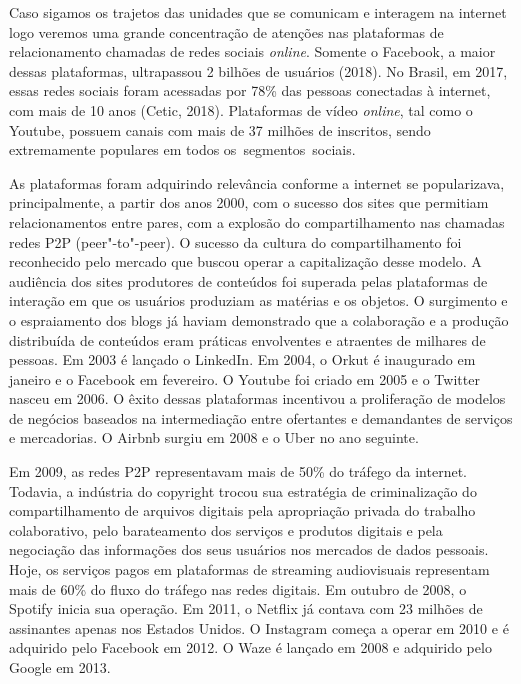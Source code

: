 Caso sigamos os trajetos das unidades que se comunicam e interagem na
internet logo veremos uma grande concentração de atenções nas
plataformas de relacionamento chamadas de redes sociais \emph{online}. Somente
o Facebook, a maior dessas plataformas, ultrapassou 2 bilhões de
usuários (2018). No Brasil, em 2017, essas redes sociais foram acessadas
por 78\% das pessoas conectadas à internet, com mais de 10 anos (Cetic,
2018). Plataformas de vídeo \emph{online}, tal como o Youtube, possuem canais
com mais de 37 milhões de inscritos, sendo extremamente populares em
todos os~segmentos~sociais.

As plataformas foram adquirindo relevância conforme a internet se
popularizava, principalmente, a partir dos anos 2000, com o sucesso dos
sites que permitiam relacionamentos entre pares, com a explosão do
compartilhamento nas chamadas redes P2P (peer"-to"-peer). O sucesso da
cultura do compartilhamento foi reconhecido pelo mercado que buscou
operar a capitalização desse modelo. A audiência dos sites produtores de
conteúdos foi superada pelas plataformas de interação em que os usuários
produziam as matérias e os objetos. O surgimento e o espraiamento dos
blogs já haviam demonstrado que a colaboração e a produção distribuída
de conteúdos eram práticas envolventes e atraentes de milhares de
pessoas. Em 2003 é lançado o LinkedIn. Em 2004, o Orkut é inaugurado em
janeiro e o Facebook em fevereiro. O Youtube foi criado em 2005 e o
Twitter nasceu em 2006. O êxito dessas plataformas incentivou a
proliferação de modelos de negócios baseados na intermediação entre
ofertantes e demandantes de serviços e mercadorias. O Airbnb surgiu em
2008 e o Uber no ano seguinte.

Em 2009, as redes P2P representavam mais de 50\% do tráfego da internet.
Todavia, a indústria do copyright trocou sua estratégia de
criminalização do compartilhamento de arquivos digitais pela apropriação
privada do trabalho colaborativo, pelo barateamento dos serviços e
produtos digitais e pela negociação das informações dos seus usuários
nos mercados de dados pessoais. Hoje, os serviços pagos em plataformas
de streaming audiovisuais representam mais de 60\% do fluxo do tráfego
nas redes digitais. Em outubro de 2008, o Spotify inicia sua operação.
Em 2011, o Netflix já contava com 23 milhões de assinantes apenas nos
Estados Unidos. O Instagram começa a operar em 2010 e é adquirido pelo
Facebook em 2012. O Waze é lançado em 2008 e adquirido pelo Google em
2013.

